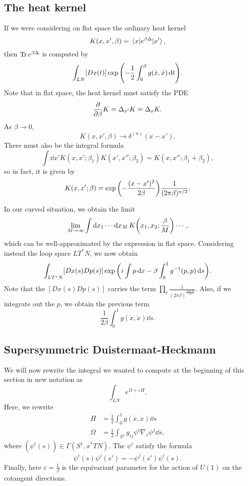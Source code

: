 \documentclass[leqno, openany]{memoir}
\theoremstyle{definition}
\theoremstyle{remark}
\theoremstyle{plain}
\theoremstyle{definition}
\theoremstyle{remark}
\newcommand{\ep}{\varepsilon}
\begin{document}
\subsection{The heat kernel}
\label{subsec:heat_kernel}

If we were considering on flat space the ordinary heat kernel
\[ K(x, x', \beta) = \mel{x}{e^{\beta \Delta}}{x'}, \]
then $\Tr e^{\beta \Delta}$ is computed by
\[ \int_{LN} [D x(t)] \exp \qty(-\frac{1}{2} \int_0^{\beta} g(\dot{x}, \dot{x}) \dd{t}). \]
Note that in flat space, the heat kernel must satisfy the PDE
\[ \pdv{\beta} K = \Delta_{x'} K = \Delta_x K. \]
As $\beta \to 0$,
\[ K(x,x',\beta) \to \delta^{(n)}(x-x'). \]
There must also be the integral formula
\[ \int \dd{x'} K(x,x';\beta_1) K(x',x'';\beta_2) = K(x,x'';\beta_1 + \beta_2), \]
so in fact, it is given by
\[ K(x,x';\beta) = \exp\qty(-\frac{(x-x')^2}{2\beta}) \frac{1}{(2\pi \beta)^{n/2}}. \]

In our curved situation, we obtain the limit
\[ \lim_{M \to \infty} \int \dd{x_1} \cdots \dd{x_M} K\qty(x_1,x_2;\frac{\beta}{M}) \cdots, \]
which can be well-approximated by the expression in flat space. Considering instead the loop space $L T^*N$, we now obtain
\[ \int_{L T^*N} [D x(s) Dp(s)] \exp \qty(i \int p \dd{x} - \beta \int_0^1 g^{-1}(p,p) \dd{s}). \]
Note that the $[D x(s) Dp(s)]$ carries the term $\prod_t \frac{1}{(2\pi\beta)^{\frac{\dim M}{2}}}$. Also, if we integrate out the $p$, we obtain the previous term
\[ \frac{1}{2\beta} \int_0^1 g(\dot{x}, \dot{x}) \dd{s}. \]

\subsection{Supersymmetric Duistermaat-Heckmann}
\label{subsec:supersymmetric}

We will now rewrite the integral we wanted to compute at the beginning of this section in new notation as
\[ \int_{LN} e^{\Omega + \ep H}. \]
Here, we rewrite
\begin{align*}
  H &= \frac{1}{2} \int_0^1 g(\dot{x}, \dot{x}) \dd{s} \\
  \Omega &= \frac{1}{2} \int_{S^1} g_{ij} \psi^i \nabla_s \psi^j \dd{s},
\end{align*}
where $(\psi^i(s)) \in \Gamma(S^1, x^* TN)$. The $\psi^i$ satisfy the formula
\[ \psi^i(s) \psi^j(s') = -\psi^j(s') \psi^i(s). \]
Finally, here $\ep = \frac{1}{\beta}$ is the equivariant parameter for the action of $U(1)$ on the cotangent directions.
\end{document}
